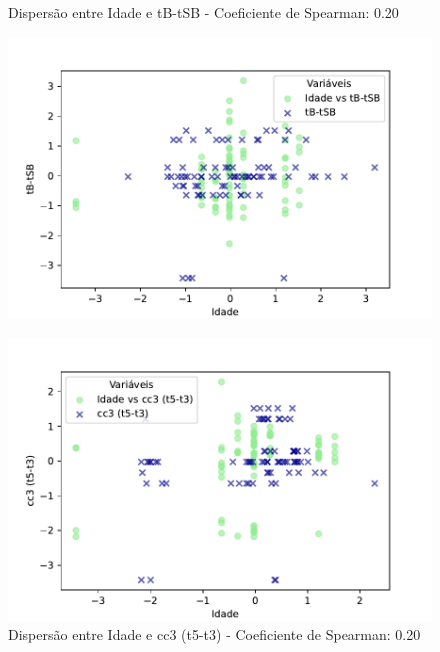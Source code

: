 \begin{figure}[h]
    \captionsetup{font=footnotesize, justification=centering, labelsep=period, position=above}
    \centering
    \begin{minipage}[b]{0.45\linewidth}
        \caption{Dispersão entre Idade e tB-tSB - Coeficiente de Spearman: 0.20}
        \label{fig:idade-tB-tSB}
        \centering
        \includegraphics[scale=0.47]{figuras/Spearman/idade-tB-tSB.pdf}
        \vspace{0.3cm}
        \begin{minipage}{\linewidth}
            \centering
        \end{minipage}
    \end{minipage}
    \hspace{0.05\linewidth}
    \begin{minipage}[b]{0.45\linewidth}
        \caption{Dispersão entre Idade e cc3 (t5-t3) - Coeficiente de Spearman: 0.20}
        \label{fig:idade-cc3}
        \centering
        \includegraphics[scale=0.47]{figuras/Spearman/idade-cc3.pdf}

\end{minipage}
\end{figure}
